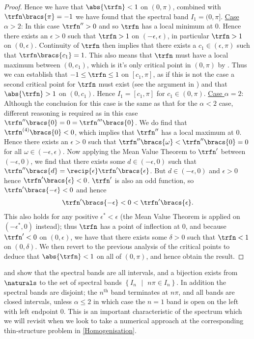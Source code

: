 \begin{proof}
	Hence we have that $\abs{\trfn}<1$ on $(0,\pi)$, combined with $\trfn\bracs{\pi}=-1$ we have found that the spectral band $I_{1}=(0,\pi]$. \newline
	\underline{Case $\alpha>2$}: In this case $\trfn^{\prime\prime}>0$ and so $\trfn$ has a local minimum at 0.
	Hence there exists an $\epsilon>0$ such that $\trfn>1$ on $(-\epsilon, \epsilon)$, in particular $\trfn>1$ on $(0, \epsilon)$.
	Continuity of $\trfn$ then implies that there exists a $c_{1}\in(\epsilon,\pi)$ such that $\trfn\bracs{c_{1}}=1$.
	This also means that $\trfn$ must have a local maximum between $(0,c_{1})$, which is it's only critical point in $(0,\pi)$ by .
	Thus we can establish that $-1\leq\trfn\leq1$ on $[c_{1}, \pi]$, as if this is not the case a second critical point for $\trfn$ must exist (see the argument in ) and that $\abs{\trfn}>1$ on $(0,c_{1})$.
	Hence $I_{1}=[c_{1},\pi]$ for $c_{1}\in(0,\pi)$. \newline
	\underline{Case $\alpha=2$}: Although the conclusion for this case is the same as that for the $\alpha<2$ case, different reasoning is required as in this case $\trfn^{\prime\prime}\bracs{0}=0=\trfn^{\prime\prime\prime}\bracs{0}$.
	We do find that $\trfn^{(4)}\bracs{0}<0$, which implies that $\trfn^{\prime\prime}$ has a local maximum at 0.
	Hence there exists an $\epsilon>0$ such that $\trfn^{\prime\prime}\bracs{\omega}<\trfn^{\prime\prime}\bracs{0}=0$ for all $\omega\in(-\epsilon,\epsilon)$.
	Now applying the Mean Value Theorem to $\trfn^{\prime}$ between $(-\epsilon,0)$, we find that there exists some $d\in(-\epsilon,0)$ such that $\trfn^{\prime\prime}\bracs{d}=\recip{\epsilon}\trfn^{\prime}\bracs{\epsilon}$.
	But $d\in(-\epsilon,0)$ and $\epsilon>0$ hence $\trfn^{\prime}\bracs{\epsilon}<0$.
	$\trfn^{\prime}$ is also an odd function, so $\trfn^{\prime}\bracs{-\epsilon}<0$ and hence
	\begin{align*}
		\trfn^{\prime}\bracs{-\epsilon} <0 <\trfn^{\prime}\bracs{\epsilon}.
	\end{align*}
	This also holds for any positive $\epsilon^{*}<\epsilon$ (the Mean Value Theorem is applied on $(-\epsilon^{*},0)$ instead); thus $\trfn$ has a point of inflection at 0, and because $\trfn^{\prime}<0$ on $(0,\epsilon)$, we have that there exists some $\delta>0$ such that $\trfn<1$ on $(0,\delta)$.
	We then revert to the previous analysis of the critical points to deduce that $\abs{\trfn}<1$ on all of $(0,\pi)$, and hence obtain the result.
\end{proof}
 and  show that the spectral bands are all intervals, and a bijection exists from $\naturals$ to the set of spectral bands $\left\{I_{n} \text{ }\vert\text{ } n\pi\in I_{n}\right\}$.
In addition the spectral bands are disjoint; the $n^{\mathrm{th}}$ band terminates at $n\pi$, and all bands are closed intervals, unless $\alpha\leq2$ in which case the $n=1$ band is open on the left with left endpoint 0.
This is an important characteristic of the spectrum which we will revisit when we look to take a numerical approach at the corresponding thin-structure problem in \cref{Homogenisation}.

